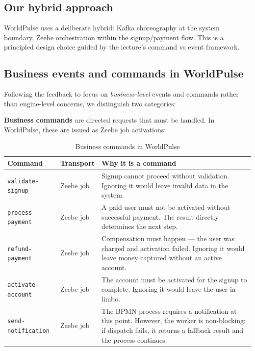 \documentclass[10pt,a4paper]{article}
\begin{document}
\subsection{Our hybrid approach}

WorldPulse uses a deliberate hybrid: Kafka choreography at the system boundary, Zeebe orchestration within the signup/payment flow. This is a principled design choice guided by the lecture's command vs event framework.

\subsection{Business events and commands in WorldPulse}

Following the feedback to focus on \emph{business-level} events and commands rather than engine-level concerns, we distinguish two categories:

\textbf{Business commands} are directed requests that must be handled. In WorldPulse, these are issued as Zeebe job activations:

\begin{table}[H]
    \centering
    \caption{Business commands in WorldPulse}
    \small
    \begin{tabular}{
        >{\raggedright\arraybackslash}p{}
        >{\raggedright\arraybackslash}p{}
        >{\raggedright\arraybackslash}p{}
    }
    \toprule
    \textbf{Command} & \textbf{Transport} & \textbf{Why it is a command} \\
    \midrule
    \texttt{validate-signup} & Zeebe job & Signup cannot proceed without validation. Ignoring it would leave invalid data in the system. \\
    \addlinespace
    \texttt{process-payment} & Zeebe job & A paid user must not be activated without successful payment. The result directly determines the next step. \\
    \addlinespace
    \texttt{refund-payment} & Zeebe job & Compensation must happen --- the user was charged and activation failed. Ignoring it would leave money captured without an active account. \\
    \addlinespace
    \texttt{activate-account} & Zeebe job & The account must be activated for the signup to complete. Ignoring it would leave the user in limbo. \\
    \addlinespace
    \texttt{send-notification} & Zeebe job & The BPMN process requires a notification at this point. However, the worker is non-blocking: if dispatch fails, it returns a fallback result and the process continues. \\
    \bottomrule
    \end{tabular}
\end{table}
\end{document}
